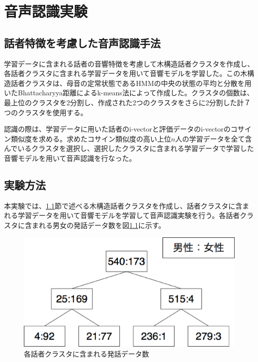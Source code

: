 \chapter{音声認識実験}
\label{chapter:speech_recog}


\section{話者特徴を考慮した音声認識手法\cite{yoshimura_clustering}}
\label{section:yoshimura_pre_clustering}
学習データに含まれる話者の音響特徴を考慮して木構造話者クラスタを作成し、各話者クラスタに含まれる学習データを用いて音響モデルを学習した。この木構造話者クラスタは、母音の定常状態であるHMMの中央の状態の平均と分散を用いたBhattacharyya距離によるk-means法によって作成した。クラスタの個数は、最上位のクラスタを2分割し、作成された2つのクラスタをさらに2分割した計７つのクラスタを使用する。\par
認識の際は、学習データに用いた話者のi-vectorと評価データのi-vectorのコサイン類似度を求める。求めたコサイン類似度の高い上位$n$人の学習データを全て含んでいるクラスタを選択し、選択したクラスタに含まれる学習データで学習した音響モデルを用いて音声認識を行なった。\par

\section{実験方法}
本実験では、\ref{section:yoshimura_pre_clustering}節で述べる木構造話者クラスタを作成し、話者クラスタに含まれる学習データを用いて音響モデルを学習して音声認識実験を行う。各話者クラスタに含まれる男女の発話データ数を図\ref{fig:yoshimura_kikouzou}に示す。


\begin{figure}[H]
  \begin{center}
    \includegraphics[scale=0.5]{./figure/yoshimura.eps}
  \end{center}
  \caption{各話者クラスタに含まれる発話データ数 \label{fig:yoshimura_kikouzou}}
\end{figure}

